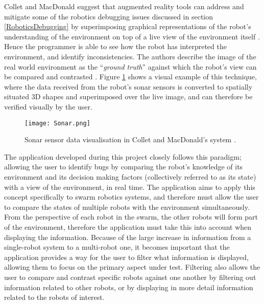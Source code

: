 Collet and MacDonald \cite{Collet:2006} suggest that augmented reality tools can address and mitigate some of the robotics debugging issues discussed in section \ref{RoboticsDebugging} by superimposing graphical representations of the robot's understanding of the environment on top of a live view of the environment itself \cite{Collet:2006}. Hence the programmer is able to see how the robot has interpreted the environment, and identify inconsistencies. The authors describe the image of the real world environment as the ``\textit{ground truth}'' against which the robot's view can be compared and contrasted \cite{Collet:2006}. Figure \ref{fig:Sonar} shows a visual example of this technique, where the data received from the robot's sonar sensors is converted to spatially situated 3D shapes and superimposed over the live image, and can therefore be verified visually by the user.

\begin{figure}
	\begin{center}
	\texttt{[image: Sonar.png]}
	\decoRule
	\caption[Sonar data visualisation. Collet and MacDonald \cite{Collet:2006}]{Sonar sensor data visualisation in Collet and MacDonald's system \cite{Collet:2006}.}
	\label{fig:Sonar}
	\end{center}
\end{figure}

The application developed during this project closely follows this paradigm; allowing the user to identify bugs by comparing the robot's knowledge of its environment and its decision making factors (collectively referred to as its state) with a view of the environment, in real time. The application aims to apply this concept specifically to swarm robotics systems, and therefore must allow the user to compare the states of multiple robots with the environment simultaneously. From the perspective of each robot in the swarm, the other robots will form part of the environment, therefore the application must take this into account when displaying the information. Because of the large increase in information from a single-robot system to a multi-robot one, it becomes important that the application provides a way for the user to filter what information is displayed, allowing them to focus on the primary aspect under test. Filtering also allows the user to compare and contrast specific robots against one another by filtering out information related to other robots, or by displaying in more detail information related to the robots of interest.

